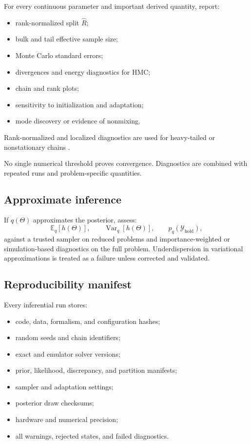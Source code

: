 \documentclass[11pt]{article}
\newcommand{\Var}{\operatorname{Var}}
\newcommand{\E}{\mathbb E}
\newcommand{\Rhat}{\widehat R}
\newcommand{\cY}{\mathcal Y}
\newcommand{\hold}{\mathrm{hold}}
\begin{document}
For every continuous parameter and important derived quantity, report:
\begin{itemize}
\item rank-normalized split \(\Rhat\);
\item bulk and tail effective sample size;
\item Monte Carlo standard errors;
\item divergences and energy diagnostics for HMC;
\item chain and rank plots;
\item sensitivity to initialization and adaptation;
\item mode discovery or evidence of nonmixing.
\end{itemize}
Rank-normalized and localized diagnostics are used for heavy-tailed or
nonstationary chains \cite{VehtariRhat2021}.

No single numerical threshold proves convergence.  Diagnostics are combined
with repeated runs and problem-specific quantities.

\subsection{Approximate inference}

If \(q(\Theta)\) approximates the posterior, assess:
\begin{equation}
 \E_q[h(\Theta)],
 \qquad
 \Var_q[h(\Theta)],
 \qquad
 p_q(\cY_{\hold}),
 \label{eq:approx-inference-tests}
\end{equation}
against a trusted sampler on reduced problems and importance-weighted or
simulation-based diagnostics on the full problem.  Underdispersion in
variational approximations is treated as a failure unless corrected and
validated.

\subsection{Reproducibility manifest}

Every inferential run stores:
\begin{itemize}
\item code, data, formalism, and configuration hashes;
\item random seeds and chain identifiers;
\item exact and emulator solver versions;
\item prior, likelihood, discrepancy, and partition manifests;
\item sampler and adaptation settings;
\item posterior draw checksums;
\item hardware and numerical precision;
\item all warnings, rejected states, and failed diagnostics.
\end{itemize}
\end{document}
